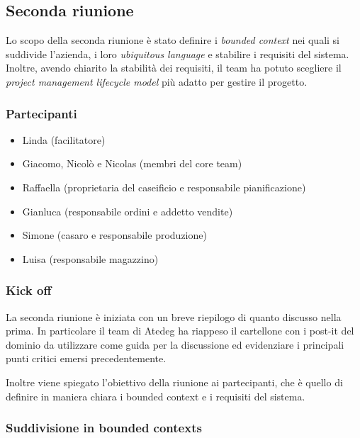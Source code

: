 \subsection{Seconda riunione}
\label{sec:seconda-riunione}

Lo scopo della seconda riunione è stato definire i \emph{bounded context} nei quali si suddivide l'azienda, i loro \emph{ubiquitous language} e stabilire i requisiti del sistema. Inoltre, avendo chiarito la stabilità dei requisiti, il team ha potuto scegliere il \emph{project management lifecycle model} più adatto per gestire il progetto.

\subsubsection{Partecipanti}
\label{sec:seconda-riunione-partecipanti}
\begin{itemize}
  \item Linda (facilitatore)
  \item Giacomo, Nicolò e Nicolas (membri del core team)
  \item Raffaella (proprietaria del caseificio e responsabile pianificazione)
  \item Gianluca (responsabile ordini e addetto vendite)
  \item Simone (casaro e responsabile produzione)
  \item Luisa (responsabile magazzino)
\end{itemize}

\subsubsection{Kick off}
\label{sec:seconda-riunione-kick-off}
La seconda riunione è iniziata con un breve riepilogo di quanto discusso nella prima.
In particolare il team di Atedeg ha riappeso il cartellone con i post-it del dominio da utilizzare come guida per la discussione ed evidenziare i principali punti critici emersi precedentemente.

Inoltre viene spiegato l'obiettivo della riunione ai partecipanti, che è quello di definire in maniera chiara i bounded context e i requisiti del sistema.

\subsubsection{Suddivisione in bounded contexts}
\label{sec:seconda-riunione-svolgimento}

